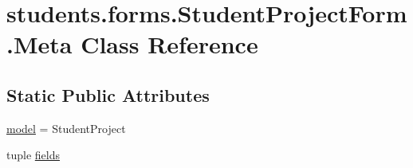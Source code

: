 \hypertarget{classstudents_1_1forms_1_1_student_project_form_1_1_meta}{\section{students.\-forms.\-Student\-Project\-Form.\-Meta Class Reference}
\label{classstudents_1_1forms_1_1_student_project_form_1_1_meta}
}
\subsection*{Static Public Attributes}
\begin{DoxyCompactItemize}
\item 
\hyperlink{classstudents_1_1forms_1_1_student_project_form_1_1_meta_a91b648e7905903f18283f7f8b2dd8dc6}{model} = Student\-Project
\item 
tuple \hyperlink{classstudents_1_1forms_1_1_student_project_form_1_1_meta_af56b70a2bc05a620e95cb6696821f537}{fields}
\end{DoxyCompactItemize}


